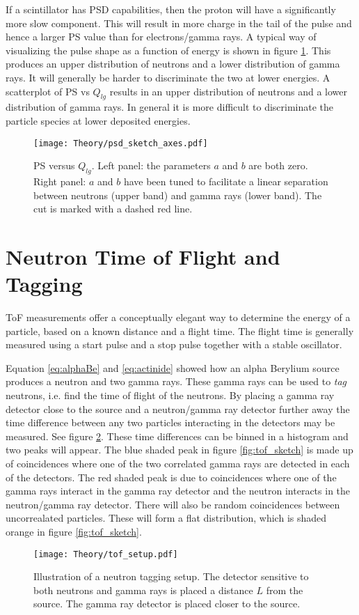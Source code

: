 \documentclass[main.tex]{subfiles}
\begin{document}
If a scintillator has PSD capabilities, then the proton will have a significantly more slow component. This will result in more charge in the tail of the pulse and hence a larger PS value than for electrons/gamma rays. A typical way of visualizing the pulse shape as a function of energy is shown in figure \ref{fig:psd_sketch}. This produces an upper distribution of neutrons and a lower distribution of gamma rays. It will generally be harder to discriminate the two at lower energies.
A scatterplot of PS vs $Q_{lg}$ results in an upper distribution of neutrons and a lower distribution of gamma rays. In general it is more difficult to discriminate the particle species at lower deposited energies.
\begin{figure}[ht]
    \centering
        \texttt{[image: Theory/psd\_sketch\_axes.pdf]}
        \caption[PS versus $Q_{lg}$]{PS versus $Q_{lg}$. Left panel: the parameters $a$ and $b$ are both zero. Right panel: $a$ and $b$ have been tuned to facilitate a linear separation between neutrons (upper band) and gamma rays (lower band). The cut is marked with a dashed red line.}
    \label{fig:psd_sketch} 
\end{figure}


\section{Neutron Time of Flight and Tagging}
ToF measurements offer a conceptually elegant way to determine the energy of a particle, based on a known distance and a flight time. The flight time is generally measured using a start pulse and a stop pulse together with a stable oscillator.

Equation \ref{eq:alphaBe} and \ref{eq:actinide} showed how an alpha Berylium source produces a neutron and two gamma rays. These gamma rays can be used to \textit{tag} neutrons, i.e. find the time of flight of the neutrons. By placing a gamma ray detector close to the source and a neutron/gamma ray detector further away the time difference between any two particles interacting in the detectors may be measured. See figure \ref{fig:tof_setup}. These time differences can be binned in a histogram and two peaks will appear. The blue shaded peak in figure \ref{fig:tof_sketch} is made up of coincidences where one of the two correlated gamma rays are detected in each of the detectors. The red shaded peak is due to coincidences where one of the gamma rays interact in the gamma ray detector and the neutron interacts in the neutron/gamma ray detector. There will also be random coincidences between uncorrealated particles. These will form a flat distribution, which is shaded orange in figure \ref{fig:tof_sketch}.
\begin{figure}[t]
    \centering
        \texttt{[image: Theory/tof\_setup.pdf]}
        \caption[Illustration of a neutron tagging setup]{Illustration of a neutron tagging setup. The detector sensitive to both neutrons and gamma rays is placed a distance $L$ from the source. The gamma ray detector is placed closer to the source.}
    \label{fig:tof_setup} 
\end{figure}
\end{document}
